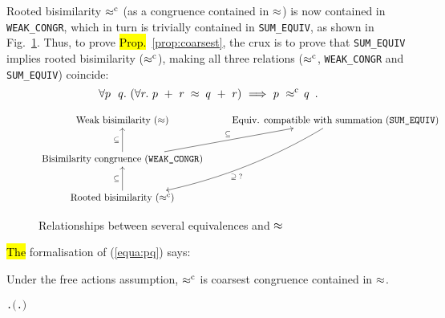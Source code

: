 Rooted bisimilarity $\mathrel{\approx^{\rm{c}}}$ (as a congruence contained in
$\approx$) is now contained in \texttt{WEAK_CONGR},
which in turn is trivially contained in \texttt{SUM_EQUIV}, as shown
in Fig.~\ref{fig:relationship}. Thus, to prove \hl{Prop.}~\ref{prop:coarsest},
the crux is to prove that \texttt{SUM_EQUIV} implies
rooted bisimilarity ($\mathrel{\approx^{\rm{c}}}$), making all three relations
($\mathrel{\approx^{\rm{c}}}$, \texttt{WEAK_CONGR} and \texttt{SUM_EQUIV}) coincide:
\begin{equation}
\label{equa:pq}
\forall p\ \ q.\ ( \forall r.\ p\ +\ r \;\approx\; q\ +\ r ) \
\Longrightarrow\ p\ \mathrel{\approx^{\rm{c}}}\ \! q\enspace.
\end{equation}

\begin{figure}[ht]
\begin{displaymath}
\xymatrix{
{\textrm{Weak bisimilarity } (\approx)} & {\textrm{Equiv.
    compatible with summation (\texttt{SUM\_EQUIV})}}
\ar@/^3ex/[ldd]^{\supseteq\; ?}\\
{\textrm{Bisimilarity congruence (\texttt{WEAK\_CONGR})}}
\ar[u]^{\subseteq} \ar[ru]^{\subseteq} \\
{\textrm{Rooted bisimilarity } (\rapprox)} \ar[u]^{\subseteq}
}
\end{displaymath}
\caption{Relationships between several equivalences and $\approx$}
\label{fig:relationship}
\end{figure}

\hl{The}  formalisation of (\ref{equa:pq}) says:
\begin{theorem}
  Under the free actions assumption, $\mathrel{\approx^{\rm{c}}}$ is coarsest congruence contained in $\approx$.
\begin{alltt}
\HOLTokenTurnstile{} \HOLSymConst{\HOLTokenForall{}} .   \HOLSymConst{\HOLTokenConj{}}   \HOLSymConst{\HOLTokenImp{}} \ensuremath{(}\HOLSymConst{\HOLTokenForall{}}.  \HOLSymConst{\ensuremath{+}}  \HOLSymConst{\HOLTokenWeakEQ}  \HOLSymConst{\ensuremath{+}} \ensuremath{)} \HOLSymConst{\HOLTokenImp{}}  \HOLSymConst{\HOLTokenObsCongr} 
\end{alltt}
\end{theorem}

